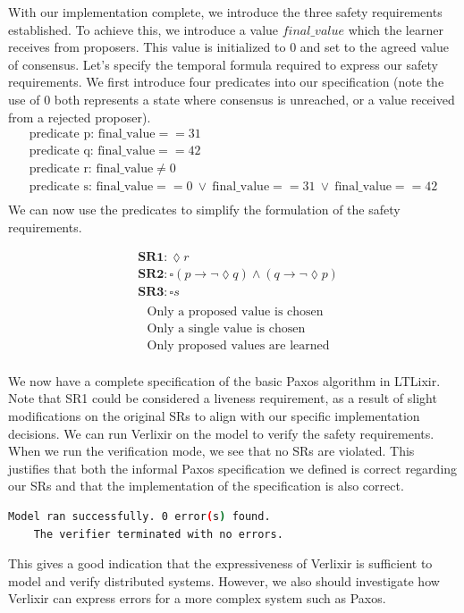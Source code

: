 \par
With our implementation complete, we introduce the three safety requirements established. To achieve this, we introduce a value $final\_value$ which the learner receives from proposers. This value is initialized to $0$ and set to the agreed value of consensus. Let's specify the temporal formula required to express our safety requirements. We first introduce four predicates into our specification (note the use of $0$ both represents a state where consensus is unreached, or a value received from a rejected proposer).
\[
\begin{array}{l}
\text{predicate p: final\_value} == 31 \\
\text{predicate q: final\_value} == 42 \\
\text{predicate r: final\_value} \neq 0 \\
\text{predicate s: final\_value} == 0 \ \lor \ \text{final\_value} == 31 \ \lor \ \text{final\_value} == 42 \\
\end{array}
\]
We can now use the predicates to simplify the formulation of the safety requirements.
\begin{multicols}{2}
    \[
    \begin{aligned}
    &\textbf{SR1}: \lozenge r \\
    &\textbf{SR2}: \square \left( p \rightarrow \neg \lozenge q \right) \land \left( q \rightarrow \neg \lozenge p \right) \\
    &\textbf{SR3}: \square s \\
    \end{aligned}
    \]
    \vline
    \[
    \begin{aligned}
    &\text{Only a proposed value is chosen} \\
    &\text{Only a single value is chosen} \\
    &\text{Only proposed values are learned} \\
    \end{aligned}
    \]
\end{multicols}
We now have a complete specification of the basic Paxos algorithm in LTLixir. Note that SR1 could be considered a liveness requirement, as a result of slight modifications on the original SRs to align with our specific implementation decisions. We can run Verlixir on the model to verify the safety requirements. When we run the verification mode, we see that no SRs are violated. This justifies that both the informal Paxos specification we defined is correct regarding our SRs and that the implementation of the specification is also correct.
\begin{lstlisting}[language=bash, xleftmargin=.3\linewidth]
    Model ran successfully. 0 error(s) found.
    The verifier terminated with no errors.
\end{lstlisting}
This gives a good indication that the expressiveness of Verlixir is sufficient to model and verify distributed systems. However, we also should investigate how Verlixir can express errors for a more complex system such as Paxos. 
